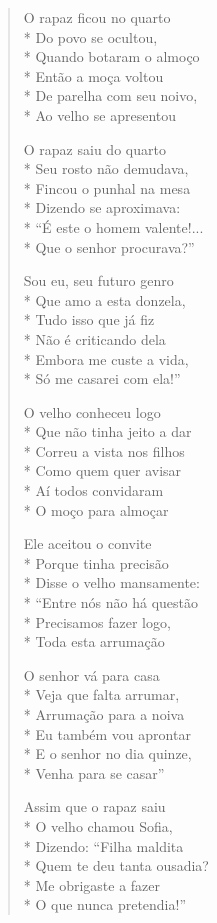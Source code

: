 \begin{verse}
O rapaz ficou no quarto\\*
Do povo se ocultou,\\*
Quando botaram o almoço\\*
Então a moça voltou\\*
De parelha com seu noivo,\\*
Ao velho se apresentou

O rapaz saiu do quarto\\*
Seu rosto não demudava,\\*
Fincou o punhal na mesa\\*
Dizendo se aproximava:\\*
``É este o homem valente!...\\*
Que o senhor procurava?''

Sou eu, seu futuro genro\\*
Que amo a esta donzela,\\*
Tudo isso que já fiz\\*
Não é criticando dela\\*
Embora me custe a vida,\\*
Só me casarei com ela!''

O velho conheceu logo\\*
Que não tinha jeito a dar\\*
Correu a vista nos filhos\\*
Como quem quer avisar\\*
Aí todos convidaram\\*
O moço para almoçar

Ele aceitou o convite\\*
Porque tinha precisão\\*
Disse o velho mansamente:\\*
``Entre nós não há questão\\*
Precisamos fazer logo,\\*
Toda esta arrumação

O senhor vá para casa\\*
Veja que falta arrumar,\\*
Arrumação para a noiva\\*
Eu também vou aprontar\\*
E o senhor no dia quinze,\\*
Venha para se casar''

Assim que o rapaz saiu\\*
O velho chamou Sofia,\\*
Dizendo: ``Filha maldita\\*
Quem te deu tanta ousadia?\\*
Me obrigaste a fazer\\*
O que nunca pretendia!''


\end{verse}
